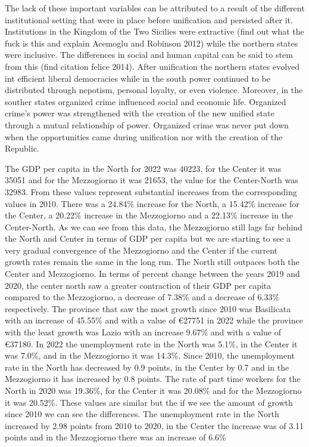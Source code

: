 \documentclass[12pt]{article}
\begin{document}
\begin{spacing}{1.5}
The lack of these important variables can be attributed to a result of the different institutional setting that were in place before unification and persisted after it. Institutions in the Kingdom of the Two Sicilies were extractive (find out what the fuck is this and explain Acemoglu and Robinson 2012) while the northern states were inclusive. The differences in social and human capital can be said to stem from this (find citation felice 2014). After unification the northern states evolved int efficient liberal democracies while in the south power continued to be distributed through nepotism, personal loyalty, or even violence. Moreover, in the souther states organized crime influenced social and economic life. Organized crime's power was strengthened with the creation of the new unified state through a mutual relationship of power. Organized crime was never put down when the opportunities came during unification nor with the creation of the Republic.

The GDP per capita in the North for 2022 was 40223, for the Center it was 35051 and for the Mezzogiorno it was 21653, the value for the Center-North was 32983. From these values represent substantial increases from the corresponding values in 2010. There was a 24.84\% increase for the North, a 15.42\% increase for the Center, a 20.22\% increase in the Mezzogiorno and a 22.13\% increase in the Center-North. As we can see from this data, the Mezzogiorno still lags far behind the North and Center in terms of GDP per capita but we are starting to see a very gradual convergence of the Mezzogiorno and the Center if the current growth rates remain the same in the long run. The North still outpaces both the Center and Mezzogiorno. In terms of percent change between the years 2019 and 2020, the center north saw a greater contraction of their GDP per capita compared to the Mezzogiorno, a decrease of 7.38\% and a decrease of 6.33\% respectively. The province that saw the most growth since 2010 was Basilicata with an increase of 45.55\% and with a value of €27751 in 2022 while the province with the least growth was Lazio with an increase 9.67\% and with a value of €37180. In 2022 the unemployment rate in the North was 5.1\%, in the Center it was 7.0\%, and in the Mezzogiorno it was 14.3\%. Since 2010, the unemployment rate in the North has decreased by 0.9 points, in the Center by 0.7 and in the Mezzogiorno it has increased by 0.8 points. The rate of part time workers for the North in 2020 was 19.36\%, for the Center it was 20.08\% and for the Mezzogiorno it was 20.52\%. These values are similar but the if we see the amount of growth since 2010 we can see the differences. The unemployment rate in the North increased by 2.98 points from 2010 to 2020, in the Center the increase was of 3.11 points and in the Mezzogiorno there was an increase of 6.6\%

\end{spacing}
\end{document}
